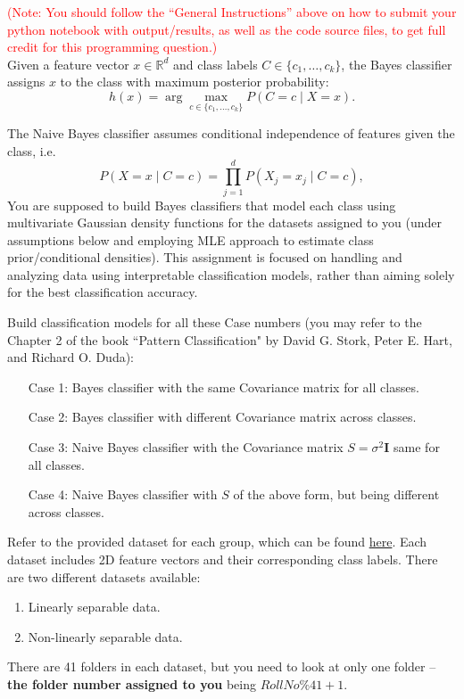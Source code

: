 \documentclass[solution,addpoints,12pt]{exam}
\newcommand{\red}[1]{\textcolor{red}{#1}}
\begin{document}
\begin{questions}
\red{(Note: You should follow the ``General Instructions'' above on how to submit your python notebook with output/results, as well as the code source files, to get full credit for this programming question.)}\\
Given a feature vector $x \in \mathbb{R}^d$ and class labels $C \in \{c_1, \dots, c_k\}$, the Bayes classifier assigns $x$ to the class with maximum posterior probability:
\[
h(x) = \arg\max_{c \in \{c_1, \dots, c_k\}} P(C=c \mid X=x).
\]

The Naive Bayes classifier assumes conditional independence of features given the class, i.e. 
\[
P(X=x \mid C=c) = \prod_{j=1}^d P(X_j = x_j \mid C=c),
\]
You are supposed to build Bayes classifiers that model each class using multivariate Gaussian density functions for the datasets assigned to you (under assumptions below and employing MLE approach to estimate class prior/conditional densities). This assignment is focused on handling and analyzing data using interpretable classification models, rather than aiming solely for the best classification accuracy. 
    
Build classification models for all these Case numbers (you may refer to the Chapter 2 of the book ``Pattern Classification" by David G. Stork, Peter E. Hart, and Richard O. Duda):
\begin{enumerate}
    \item[Case 1:] Bayes classifier with the same Covariance matrix for all classes.
    \item[Case 2:] Bayes classifier with different Covariance matrix across classes.
    \item[Case 3:] Naive Bayes classifier with the Covariance matrix $S = \sigma^2 \mathbf{I}$ same for all classes.
    \item[Case 4:] Naive Bayes classifier with $S$ of the above form, but being different across classes.
\end{enumerate}
    
Refer to the provided dataset for each group, which can be found  \href{https://drive.google.com/drive/folders/1YwSDijf-LOF3HZwSBoMc5R02TH_o12s3?usp=sharing}{here}. Each dataset includes 2D feature vectors and their corresponding class labels. There are two different datasets available:
\begin{enumerate}
    \item Linearly separable data.
    \item Non-linearly separable data.
\end{enumerate}
There are 41 folders in each dataset, but you need to look at only one folder -- {\bf the folder number assigned to you} being $RollNo\%41 + 1$.
    

\end{questions}
\end{document}
